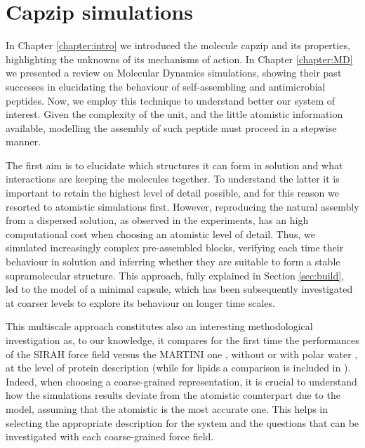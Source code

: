 \chapter{Capzip simulations} \label{chapter:capzip_results}

In Chapter \ref{chapter:intro} we introduced the molecule capzip and its properties, highlighting the unknowns of its mechanisms of action. In Chapter \ref{chapter:MD} we presented a review on Molecular Dynamics simulations, showing their past successes in elucidating the behaviour of self-assembling and antimicrobial peptides.
%
Now, we employ this technique to understand better our system of interest. Given the complexity of the unit, and the little atomistic information available, modelling the assembly of such peptide must proceed in a stepwise manner.

The first aim is to elucidate which structures it can form in solution and what interactions are keeping the molecules together. To understand the latter it is important to retain the highest level of detail possible, and for this reason we resorted to atomistic simulations first.
%
However, reproducing the natural assembly from a dispersed solution, as observed in the experiments, has an high computational cost when choosing an atomistic level of detail.
%
Thus, we simulated increasingly complex pre-assembled blocks, verifying each time their behaviour in solution and inferring whether they are suitable to form a stable supramolecular structure. This approach, fully explained in Section \ref{sec:build}, led to the model of a minimal capsule, which has been subsequently investigated at coarser levels to explore its behaviour on longer time scales.

This multiscale approach constitutes also an interesting methodological investigation as, to our knowledge, it compares for the first time the performances of the SIRAH force field \citep{Machado2018,Barrera2019} versus the MARTINI one \citep{Marrink2007, Monticelli2008}, without or with polar water \citep{Yesylevskyy2010}, at the level of protein description (while for lipids a comparison is included in \citet{Barrera2019}). Indeed, when choosing a coarse-grained representation, it is crucial to understand how the simulations results deviate from the atomistic counterpart due to the model, assuming that the atomistic is the most accurate one. This helps in selecting the appropriate description for the system and the questions that can be investigated with each coarse-grained force field.

